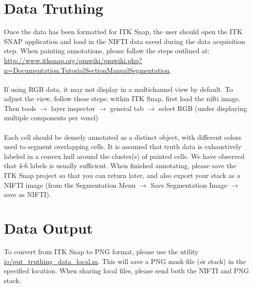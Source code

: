 \documentclass[11pt]{amsart}
\begin{document}
\section{Data Truthing}
\noindent Once the data has been formatted for ITK Snap, the user should open the ITK SNAP application and load in the NIFTI data saved during the data acquisition step.  When painting annotations, please follow the steps outlined at: \url{http://www.itksnap.org/pmwiki/pmwiki.php?n=Documentation.TutorialSectionManualSegmentation}.  \\ \\
If using RGB data, it may not display in a multichannel view by default.  To adjust the view, follow these steps:  within ITK Snap, first load the nifti image.  Then tools $\rightarrow$ layer inspector $\rightarrow$ general tab $\rightarrow$ select RGB (under displaying multiple components per voxel)
\\ \\
\noindent Each cell should be densely annotated as a distinct object, with different colors used to segment overlapping cells.  It is assumed that truth data is exhaustively labeled in a convex hull around the cluster(s) of painted cells.   We have observed that 4-6 labels is usually sufficient.  When finished annotating, please save the ITK Snap project so that you can return later, and also export your stack as a NIFTI image (from the Segmentation Menu $\rightarrow$ Save Segmentation Image $\rightarrow$ save as NIFTI).  

\section{Data Output}
To convert from ITK Snap to PNG format, please use the utility \url{io/put_truthing_data_local.m}.  This will save a PNG mask file (or stack) in the specified location.  When sharing local files, please send both the NIFTI and PNG stack.
\end{document}
